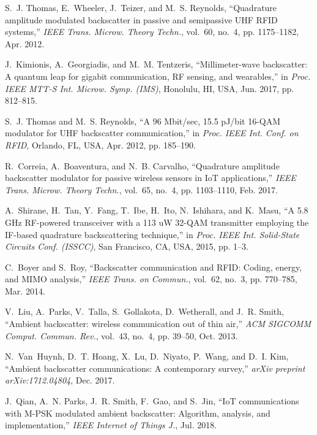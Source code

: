 \documentclass[journal]{IEEEtran}
\begin{document}
\begin{thebibliography}{10}
S.~J. Thomas, E.~Wheeler, J.~Teizer, and M.~S. Reynolds, ``Quadrature amplitude
  modulated backscatter in passive and semipassive {UHF} {RFID} systems,''
  \emph{{IEEE} Trans. Microw. Theory Techn.}, vol.~60, no.~4, pp. 1175--1182,
  Apr. 2012.

J.~Kimionis, A.~Georgiadis, and M.~M. Tentzeris, ``Millimeter-wave backscatter:
  A quantum leap for gigabit communication, {RF} sensing, and wearables,'' in
  \emph{Proc. {IEEE} MTT-S Int. Microw. Symp. (IMS)}, Honolulu, HI, USA, Jun.
  2017, pp. 812--815.

S.~J. Thomas and M.~S. Reynolds, ``A 96 {M}bit/sec, 15.5 p{J}/bit 16-{QAM}
  modulator for {UHF} backscatter communication,'' in \emph{Proc. {IEEE} Int.
  Conf. on RFID}, Orlando, FL, USA, Apr. 2012, pp. 185--190.

R.~Correia, A.~Boaventura, and N.~B. Carvalho, ``Quadrature amplitude
  backscatter modulator for passive wireless sensors in {I}o{T} applications,''
  \emph{{IEEE} Trans. Microw. Theory Techn.}, vol.~65, no.~4, pp. 1103--1110,
  Feb. 2017.

A.~Shirane, H.~Tan, Y.~Fang, T.~Ibe, H.~Ito, N.~Ishihara, and K.~Masu, ``A 5.8
  {GH}z {RF}-powered transceiver with a 113 u{W} 32-{QAM} transmitter employing
  the {IF}-based quadrature backscattering technique,'' in \emph{Proc. {IEEE}
  Int. Solid-State Circuits Conf. (ISSCC)}, San {F}rancisco, CA, USA, 2015, pp.
  1--3.

C.~Boyer and S.~Roy, ``Backscatter communication and {RFID}: Coding, energy,
  and {MIMO} analysis,'' \emph{{IEEE} Trans. on Commun.}, vol.~62, no.~3, pp.
  770--785, Mar. 2014.

V.~Liu, A.~Parks, V.~Talla, S.~Gollakota, D.~Wetherall, and J.~R. Smith,
  ``Ambient backscatter: wireless communication out of thin air,'' \emph{ACM
  SIGCOMM Comput. Commun. Rev.}, vol.~43, no.~4, pp. 39--50, Oct. 2013.

N.~Van~Huynh, D.~T. Hoang, X.~Lu, D.~Niyato, P.~Wang, and D.~I. Kim, ``Ambient
  backscatter communications: A contemporary survey,'' \emph{arXiv preprint
  arXiv:1712.04804}, Dec. 2017.

J.~Qian, A.~N. Parks, J.~R. Smith, F.~Gao, and S.~Jin, ``{I}o{T} communications
  with {M-PSK} modulated ambient backscatter: Algorithm, analysis, and
  implementation,'' \emph{{IEEE} Internet of Things J.}, Jul. 2018.


\end{thebibliography}
\end{document}
